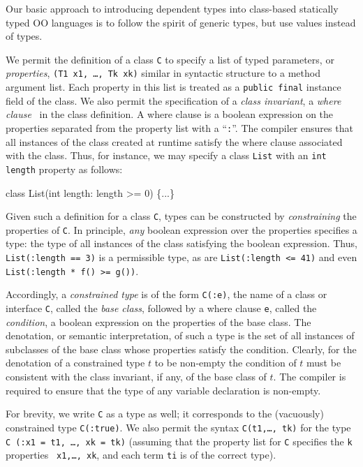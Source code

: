 Our basic approach to introducing dependent types into
class-based statically typed OO languages is to
follow the spirit of generic types, but use values instead of
types.

We permit the definition of a class {\tt C} to specify
a list of typed parameters, or {\em properties},
{\tt (T1 x1, \ldots, Tk xk)} similar in syntactic structure to
a method argument list. Each
property in this list is treated as a {\tt public final} instance
field of the class.
We also permit the
specification of a {\em class invariant}, a
{\em where clause}~\cite{where-clauses}
in the class definition. A where
clause is a boolean expression on the properties separated from the
property list with a ``{\tt :}''.  The compiler ensures that all
instances of the class created at runtime satisfy the where clause
associated with the class.
Thus, for instance, we may specify a class {\tt List} with an
{\tt int length} property as follows:
{\footnotesize
\begin{code}
  class List(int length: length >= 0) \{...\}
\end{code}}

Given such a definition for a class {\tt C},
types can be constructed by {\em constraining} the properties of
{\tt C}.
In principle, {\em any} boolean expression over the
properties specifies a type: the type of all instances of the
class satisfying the boolean expression. Thus,
{\tt List(:length == 3)} is a permissible type, as are
{\tt List(:length <= 41)} and even
{\tt List(:length * f() >= g())}.


Accordingly, a {\em constrained type} is of the form {\tt C(:e)}, the name of
a class or interface {\tt C}, called the {\em base class}, followed by a
where clause {\tt e}, called the {\em condition}, a boolean expression
on the properties of the base class. 
The denotation, or
semantic interpretation, of such a type is the set of all instances
of subclasses of the base class whose properties satisfy the
condition.
Clearly, for the denotation of a constrained type $t$ to be
non-empty the condition of $t$ must be consistent with the class
invariant, if any, of the base class of $t$.  The compiler is required to
ensure that the type of any variable declaration is non-empty.

For brevity, we write {\tt C} as a type as well; it
corresponds to the (vacuously) constrained type {\tt C(:true)}.
We also permit the syntax {\tt C(t1,\ldots, tk)} for
the type {\tt C (:x1 = t1, \ldots, xk = tk)} (assuming that
the property list for {\tt C} specifies the {\tt k} properties {\tt
x1,\ldots, xk}, and each term {\tt ti} is of the correct
type). 


